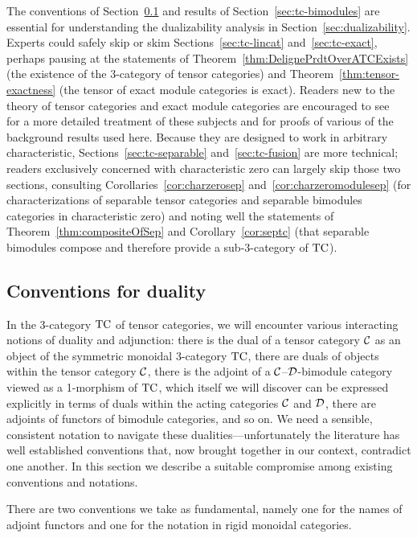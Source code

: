 \documentclass{amsart}
\begin{document}
The conventions of Section~\ref{sec:conventions} and results of Section~\ref{sec:tc-bimodules} are essential for understanding the dualizability analysis in Section~\ref{sec:dualizability}.  Experts could safely skip or skim Sections~\ref{sec:tc-lincat} and~\ref{sec:tc-exact}, perhaps pausing at the statements of Theorem~\ref{thm:DelignePrdtOverATCExists} (the existence of the 3-category of tensor categories) and Theorem~\ref{thm:tensor-exactness} (the tensor of exact module categories is exact).  Readers new to the theory of tensor categories and exact module categories are encouraged to see~\cite{BTP} for a more detailed treatment of these subjects and for proofs of various of the background results used here.  Because they are designed to work in arbitrary characteristic, Sections~\ref{sec:tc-separable} and~\ref{sec:tc-fusion} are more technical; readers exclusively concerned with characteristic zero can largely skip those two sections, consulting Corollaries~\ref{cor:charzerosep} and~\ref{cor:charzeromodulesep} (for characterizations of separable tensor categories and separable bimodules categories in characteristic zero) and noting well the statements of Theorem~\ref{thm:compositeOfSep} and Corollary~\ref{cor:septc} (that separable bimodules compose and therefore provide a sub-3-category of $\mathrm{TC}$).

\subsection{Conventions for duality} \label{sec:conventions}


In the 3-category $\mathrm{TC}$ of tensor categories, we will encounter various interacting notions of duality and adjunction: there is the dual of a tensor category $\mathcal C$ as an object of the symmetric monoidal 3-category $\mathrm{TC}$, there are duals of objects within the tensor category $\mathcal C$, there is the adjoint of a $\mathcal C$--$\mathcal D$-bimodule category viewed as a 1-morphism of $\mathrm{TC}$, which itself we will discover can be expressed explicitly in terms of duals within the acting categories $\mathcal C$ and $\mathcal D$, there are adjoints of functors of bimodule categories, and so on.  We need a sensible, consistent notation to navigate these dualities---unfortunately the literature has well established conventions that, now brought together in our context, contradict one another.  In this section we describe a suitable compromise among existing conventions and notations.

There are two conventions we take as fundamental, namely one for the names of adjoint functors and one for the notation in rigid monoidal categories.
\end{document}
